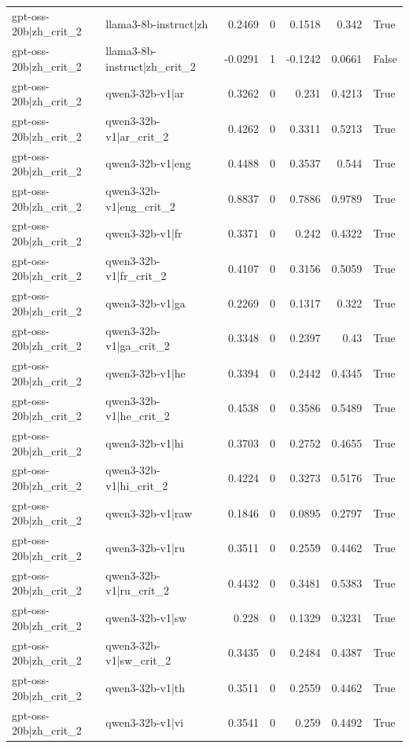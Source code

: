 \begin{table}
\begin{tabular}{l l r r r r l}
gpt-oss-20b|zh_crit_2 & llama3-8b-instruct|zh & 0.2469 & 0 & 0.1518 & 0.342 & True \\
gpt-oss-20b|zh_crit_2 & llama3-8b-instruct|zh_crit_2 & -0.0291 & 1 & -0.1242 & 0.0661 & False \\
gpt-oss-20b|zh_crit_2 & qwen3-32b-v1|ar & 0.3262 & 0 & 0.231 & 0.4213 & True \\
gpt-oss-20b|zh_crit_2 & qwen3-32b-v1|ar_crit_2 & 0.4262 & 0 & 0.3311 & 0.5213 & True \\
gpt-oss-20b|zh_crit_2 & qwen3-32b-v1|eng & 0.4488 & 0 & 0.3537 & 0.544 & True \\
gpt-oss-20b|zh_crit_2 & qwen3-32b-v1|eng_crit_2 & 0.8837 & 0 & 0.7886 & 0.9789 & True \\
gpt-oss-20b|zh_crit_2 & qwen3-32b-v1|fr & 0.3371 & 0 & 0.242 & 0.4322 & True \\
gpt-oss-20b|zh_crit_2 & qwen3-32b-v1|fr_crit_2 & 0.4107 & 0 & 0.3156 & 0.5059 & True \\
gpt-oss-20b|zh_crit_2 & qwen3-32b-v1|ga & 0.2269 & 0 & 0.1317 & 0.322 & True \\
gpt-oss-20b|zh_crit_2 & qwen3-32b-v1|ga_crit_2 & 0.3348 & 0 & 0.2397 & 0.43 & True \\
gpt-oss-20b|zh_crit_2 & qwen3-32b-v1|he & 0.3394 & 0 & 0.2442 & 0.4345 & True \\
gpt-oss-20b|zh_crit_2 & qwen3-32b-v1|he_crit_2 & 0.4538 & 0 & 0.3586 & 0.5489 & True \\
gpt-oss-20b|zh_crit_2 & qwen3-32b-v1|hi & 0.3703 & 0 & 0.2752 & 0.4655 & True \\
gpt-oss-20b|zh_crit_2 & qwen3-32b-v1|hi_crit_2 & 0.4224 & 0 & 0.3273 & 0.5176 & True \\
gpt-oss-20b|zh_crit_2 & qwen3-32b-v1|raw & 0.1846 & 0 & 0.0895 & 0.2797 & True \\
gpt-oss-20b|zh_crit_2 & qwen3-32b-v1|ru & 0.3511 & 0 & 0.2559 & 0.4462 & True \\
gpt-oss-20b|zh_crit_2 & qwen3-32b-v1|ru_crit_2 & 0.4432 & 0 & 0.3481 & 0.5383 & True \\
gpt-oss-20b|zh_crit_2 & qwen3-32b-v1|sw & 0.228 & 0 & 0.1329 & 0.3231 & True \\
gpt-oss-20b|zh_crit_2 & qwen3-32b-v1|sw_crit_2 & 0.3435 & 0 & 0.2484 & 0.4387 & True \\
gpt-oss-20b|zh_crit_2 & qwen3-32b-v1|th & 0.3511 & 0 & 0.2559 & 0.4462 & True \\
gpt-oss-20b|zh_crit_2 & qwen3-32b-v1|vi & 0.3541 & 0 & 0.259 & 0.4492 & True \\

\end{tabular}
\end{table}
